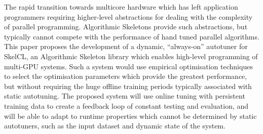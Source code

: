 The rapid transition towards multicore hardware which has left
application programmers requiring higher-level abstractions for
dealing with the complexity of parallel programming. Algorithmic
Skeletons provide such abstractions, but typically cannot compete with
the performance of hand tuned parallel algorithms.
This paper proposes the development of a dynamic, ``always-on''
autotuner for SkelCL, an Algorithmic Skeleton library which enables
high-level programming of multi-GPU systems. Such a system would use
empirical optimisation techniques to select the optimisation
parameters which provide the greatest performance, but without
requiring the huge offline training periods typically associated with
static autotuning. The proposed system will use online tuning with
persistent training data to create a feedback loop of constant testing
and evaluation, and will be able to adapt to runtime properties which
cannot be determined by static autotuners, such as the input dataset
and dynamic state of the system.
